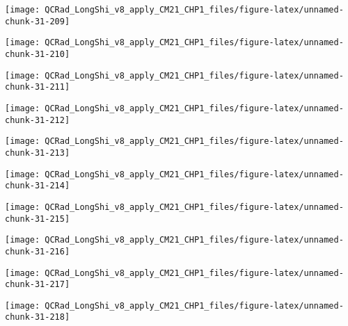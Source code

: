 \documentclass[
  10pt,
  a4paper,oneside]{article}
\begin{document}
\begin{center}\texttt{[image: QCRad\_LongShi\_v8\_apply\_CM21\_CHP1\_files/figure-latex/unnamed-chunk-31-209]} \end{center}

\begin{center}\texttt{[image: QCRad\_LongShi\_v8\_apply\_CM21\_CHP1\_files/figure-latex/unnamed-chunk-31-210]} \end{center}

\begin{center}\texttt{[image: QCRad\_LongShi\_v8\_apply\_CM21\_CHP1\_files/figure-latex/unnamed-chunk-31-211]} \end{center}

\begin{center}\texttt{[image: QCRad\_LongShi\_v8\_apply\_CM21\_CHP1\_files/figure-latex/unnamed-chunk-31-212]} \end{center}

\begin{center}\texttt{[image: QCRad\_LongShi\_v8\_apply\_CM21\_CHP1\_files/figure-latex/unnamed-chunk-31-213]} \end{center}

\begin{center}\texttt{[image: QCRad\_LongShi\_v8\_apply\_CM21\_CHP1\_files/figure-latex/unnamed-chunk-31-214]} \end{center}

\begin{center}\texttt{[image: QCRad\_LongShi\_v8\_apply\_CM21\_CHP1\_files/figure-latex/unnamed-chunk-31-215]} \end{center}

\begin{center}\texttt{[image: QCRad\_LongShi\_v8\_apply\_CM21\_CHP1\_files/figure-latex/unnamed-chunk-31-216]} \end{center}

\begin{center}\texttt{[image: QCRad\_LongShi\_v8\_apply\_CM21\_CHP1\_files/figure-latex/unnamed-chunk-31-217]} \end{center}

\begin{center}\texttt{[image: QCRad\_LongShi\_v8\_apply\_CM21\_CHP1\_files/figure-latex/unnamed-chunk-31-218]} \end{center}
\end{document}
